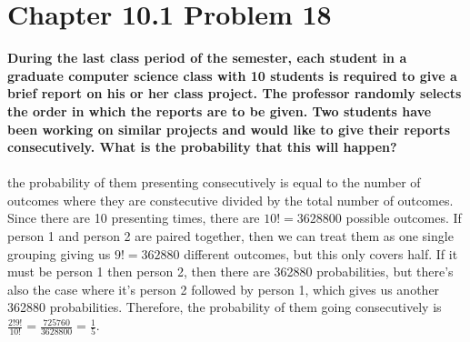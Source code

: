 \documentclass[10pt]{article}
\begin{document}
\section{Chapter 10.1 Problem 18}
\textbf{During the last class period of the semester, each student in a graduate computer science class with 10 students is required 
    to give a brief report on his or her class project. The professor randomly selects the order in which the reports are to be given. 
    Two students have been working on similar projects and would like to give their reports consecutively. What is the probability that 
    this will happen?} \\\\
the probability of them presenting consecutively is equal to the number of outcomes where they are constecutive divided by the total number of
outcomes.  Since there are 10 presenting times, there are $10! = 3628800$ possible outcomes.  If person 1 and person 2 are paired together, then
we can treat them as one single grouping giving us $9! = 362880$ different outcomes, but this only covers half.  If it must be person 1 then 
person 2, then there are 362880 probabilities, but there's also the case where it's person 2 followed by person 1, which gives us another 362880
probabilities.  Therefore, the probability of them going consecutively is $\frac{2!9!}{10!} = \frac{725760}{3628800} = \frac15$.
\\\\\\\\
\end{document}
